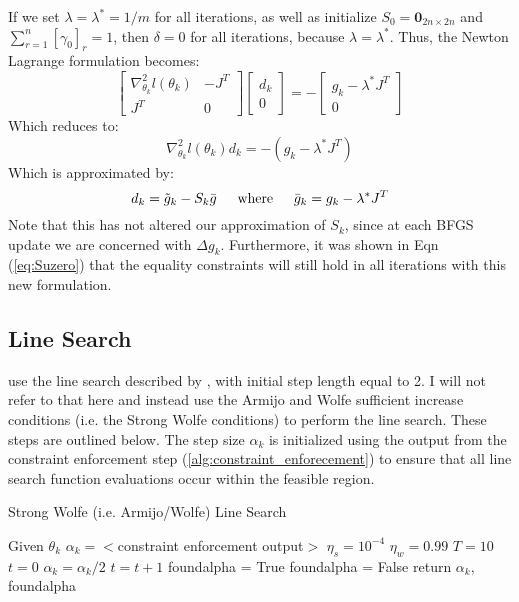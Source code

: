 \documentclass[letter,12pt]{article}
\begin{document}
If we set $\lambda=\lambda^*=1/m$ for all iterations, as well as initialize $S_0 = \boldsymbol{0}_{2n \times 2n}$ and $\sum_{r=1}^{n}[\gamma_0]_r=1$, then $\delta=0$  for all iterations, because $\lambda=\lambda^*$.  Thus, the Newton Lagrange formulation becomes:  
\[
\left[
\begin{array}{cc}
\nabla^2_{\theta_k}l(\theta_k) & -J^T
\\
J^T & 0
\end{array}
\right]
\left[
\begin{array}{cc}
d_k
\\
0
\end{array}
\right]
=
-
\left[
\begin{array}{c}
g_k - \lambda^* J^T
\\
0
\end{array}
\right]
\]
Which reduces to:
\[
\nabla^2_{\theta_k}l(\theta_k)d_k
=
-(g_k - \lambda^*J^T)
\]
Which is approximated by:
\[
d_k = \tilde{g}_k-S_k\bar{g}
\indent
\text{where}
\indent
\bar{g}_k = g_k-\lambda^*J^T
\]
Note that this has not altered our approximation of $S_k$, since at each BFGS update we are concerned with $\Delta g_k$.  Furthermore, it was shown in Eqn (\ref{eq:Suzero}) that the equality constraints will still hold in all iterations with this new formulation.

\subsection{Line Search}

\cite{jamshidianj97} use the line search described by \cite{jamshidianj93}, with initial step length equal to 2.  I will not refer to that here and instead use the Armijo and Wolfe sufficient increase conditions (i.e. the Strong Wolfe conditions) to perform the line search.  These steps are outlined below.  The step size $\alpha_k$ is initialized using the output from the constraint enforcement step (\ref{alg:constraint_enforecement}) to ensure that all line search function evaluations occur within the feasible region.


\begin{algorithm} 
\caption{Strong Wolfe (i.e. Armijo/Wolfe) Line Search}
\label{alg:armijo_wolfe}
\begin{algorithmic}[1]
\State Given $\theta_k$
\State $\alpha_k = <$constraint enforcement output$>$
\State $\eta_s = 10^{-4}$
\State $\eta_w = 0.99$
\State $T = 10$
\State $t = 0$
\State $\alpha_k = \alpha_k / 2$
\State $t = t + 1$
\EndWhile
{}
\State	foundalpha = True
\Else
\State  foundalpha = False
\EndIf
\State return $\alpha_k$, foundalpha
\end{algorithmic}
\end{algorithm}
\end{document}
